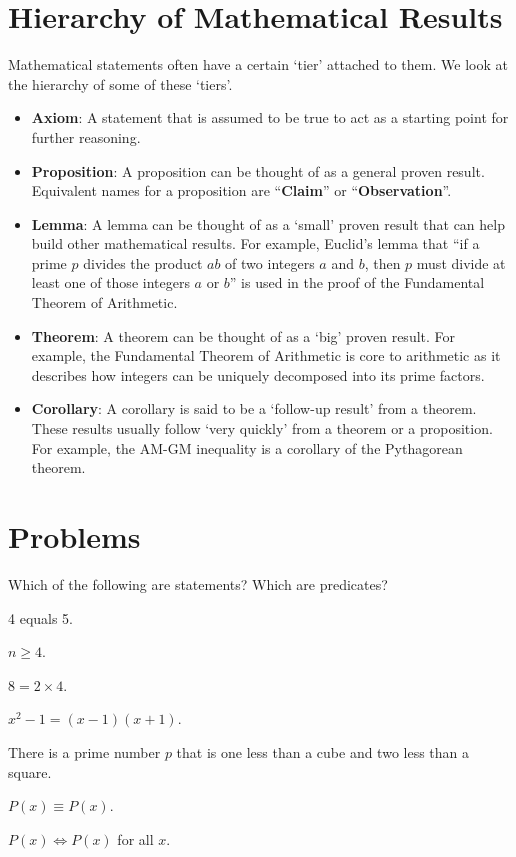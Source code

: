 \section{Hierarchy of Mathematical Results}
Mathematical statements often have a certain `tier' attached to them. We look at the hierarchy of some of these `tiers'.
\begin{itemize}
    \item \textbf{Axiom}: A statement that is assumed to be true to act as a starting point for further reasoning.
    \item \textbf{Proposition}: A proposition can be thought of as a general proven result. Equivalent names for a proposition are ``\textbf{Claim}'' or ``\textbf{Observation}''.
    \item \textbf{Lemma}: A lemma can be thought of as a `small' proven result that can help build other mathematical results. For example, Euclid's lemma that ``if a prime $p$ divides the product $ab$ of two integers $a$ and $b$, then $p$ must divide at least one of those integers $a$ or $b$'' is used in the proof of the Fundamental Theorem of Arithmetic.
    \item \textbf{Theorem}: A theorem can be thought of as a `big' proven result. For example, the Fundamental Theorem of Arithmetic is core to arithmetic as it describes how integers can be uniquely decomposed into its prime factors.
    \item \textbf{Corollary}: A corollary is said to be a `follow-up result' from a theorem. These results usually follow `very quickly' from a theorem or a proposition. For example, the AM-GM inequality is a corollary of the Pythagorean theorem.
\end{itemize}

\newpage

\section{Problems}
\begin{problem}
    Which of the following are statements? Which are predicates?
    \begin{partquestions}{\alph*}
        \item 4 equals 5.
        \item $n \geq 4$.
        \item $8 = 2 \times 4$.
        \item $x^2 - 1 = (x-1)(x+1)$.
        \item There is a prime number $p$ that is one less than a cube and two less than a square.
        \item $P(x) \equiv P(x)$.
        \item $P(x) \iff P(x)$ for all $x$.
    \end{partquestions}
\end{problem}

